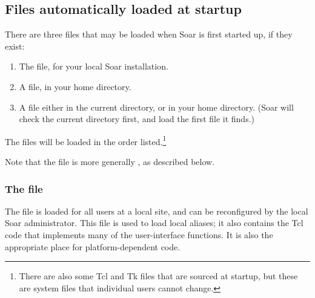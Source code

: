 {

\subsection{Files automatically loaded at startup}
\label{INTERFACE-files}



There are three files that may be loaded when Soar is first started up, if
they exist:\vspace{-12pt}
\begin{enumerate}
\item The  file, for your local Soar
	installation.\vspace{-6pt}
\item A  file, in your home directory.\vspace{-6pt}
\item A  file either in the current directory, or in your home
	directory. (Soar will check the current directory first, and load the
	first  file it finds.)
\end{enumerate}

The files will be loaded in the order listed.\footnote{There are also some Tcl
and Tk files that are sourced at startup, but these are system files that
individual users cannot change.}

Note that the  file is more generally
, as described below.


\subsubsection*{The  file}

The  file is loaded for all users at a local
site, and can be reconfigured by the local Soar administrator. This file is used
to load local aliases; it also contains the Tcl code that implements many of
the user-interface functions. It is also the appropriate place for
platform-dependent code.

}

